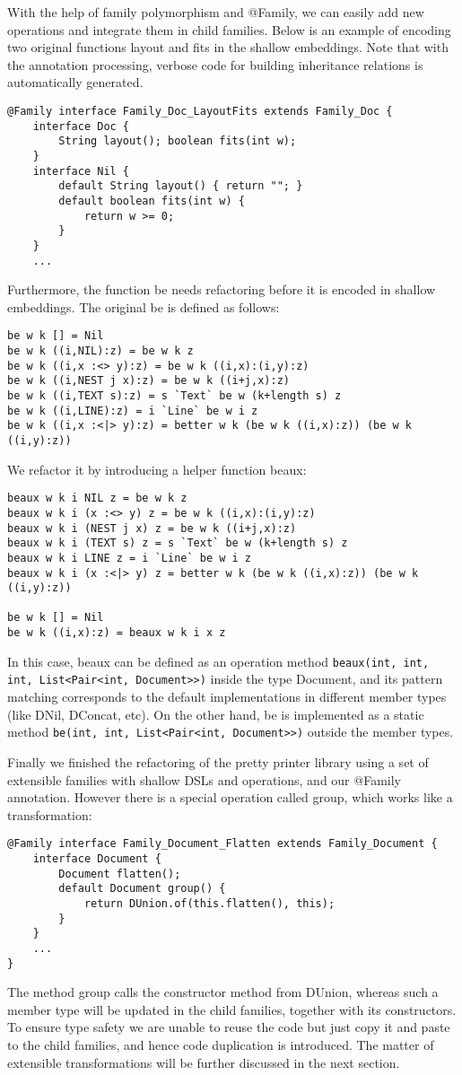 With the help of family polymorphism and \textsf{@Family}, we can easily add new operations and integrate them
in child families. Below is an example of encoding two original functions \textsf{layout} and \textsf{fits} in
the shallow embeddings. Note that with the annotation processing, verbose code for building inheritance relations is
automatically generated.
\begin{lstlisting}
@Family interface Family_Doc_LayoutFits extends Family_Doc {
	interface Doc {
		String layout(); boolean fits(int w);
	}
	interface Nil {
		default String layout() { return ""; }
		default boolean fits(int w) {
			return w >= 0;
		}
	}
	...
\end{lstlisting}
Furthermore, the function \textsf{be} needs refactoring before it is encoded in shallow embeddings.
The original \textsf{be} is defined as follows:
\begin{lstlisting}
be w k [] = Nil
be w k ((i,NIL):z) = be w k z
be w k ((i,x :<> y):z) = be w k ((i,x):(i,y):z)
be w k ((i,NEST j x):z) = be w k ((i+j,x):z)
be w k ((i,TEXT s):z) = s `Text` be w (k+length s) z
be w k ((i,LINE):z) = i `Line` be w i z
be w k ((i,x :<|> y):z) = better w k (be w k ((i,x):z)) (be w k ((i,y):z))
\end{lstlisting}
We refactor it by introducing a helper function \textsf{beaux}:
\begin{lstlisting}
beaux w k i NIL z = be w k z
beaux w k i (x :<> y) z = be w k ((i,x):(i,y):z)
beaux w k i (NEST j x) z = be w k ((i+j,x):z)
beaux w k i (TEXT s) z = s `Text` be w (k+length s) z
beaux w k i LINE z = i `Line` be w i z
beaux w k i (x :<|> y) z = better w k (be w k ((i,x):z)) (be w k ((i,y):z))

be w k [] = Nil
be w k ((i,x):z) = beaux w k i x z
\end{lstlisting}
In this case, \textsf{beaux} can be defined as an operation method \lstinline{beaux(int, int, int, List<Pair<int, Document>>)} inside the type \textsf{Document}, and
its pattern matching corresponds to the default implementations in different member types (like \textsf{DNil}, \textsf{DConcat}, etc). On the other hand, \textsf{be} is implemented as a static method 
\lstinline{be(int, int, List<Pair<int, Document>>)} outside the member types.

Finally we finished the refactoring of the pretty printer library using a set of extensible families with shallow DSLs and operations, and our
\textsf{@Family} annotation. However there is a special operation called \textsf{group}, which works like a transformation:
\begin{lstlisting}
@Family interface Family_Document_Flatten extends Family_Document {
	interface Document {
		Document flatten();
		default Document group() {
			return DUnion.of(this.flatten(), this);
		}
	}
	...
}
\end{lstlisting}
The method \textsf{group} calls the constructor method from \textsf{DUnion}, whereas such a member type will be updated in the
child families, together with its constructors. To ensure type safety we are unable to reuse the code but just copy it and paste
to the child families, and hence code duplication is introduced. The matter of extensible transformations will be further discussed
in the next section.
